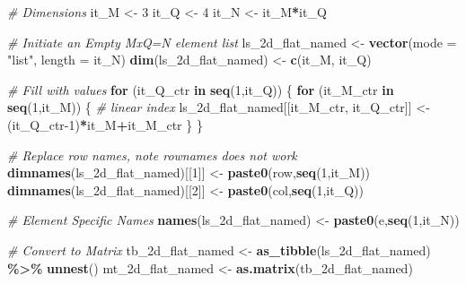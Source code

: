\documentclass[
]{book}
\newenvironment{Shaded}{\begin{snugshade}}{\end{snugshade}}
\newcommand{\CommentTok}[1]{\textcolor[rgb]{0.56,0.35,0.01}{\textit{#1}}}
\newcommand{\ControlFlowTok}[1]{\textcolor[rgb]{0.13,0.29,0.53}{\textbf{#1}}}
\newcommand{\DataTypeTok}[1]{\textcolor[rgb]{0.13,0.29,0.53}{#1}}
\newcommand{\DecValTok}[1]{\textcolor[rgb]{0.00,0.00,0.81}{#1}}
\newcommand{\KeywordTok}[1]{\textcolor[rgb]{0.13,0.29,0.53}{\textbf{#1}}}
\newcommand{\NormalTok}[1]{#1}
\newcommand{\OperatorTok}[1]{\textcolor[rgb]{0.81,0.36,0.00}{\textbf{#1}}}
\newcommand{\StringTok}[1]{\textcolor[rgb]{0.31,0.60,0.02}{#1}}
\begin{document}
\begin{Shaded}
\begin{Highlighting}[]
\CommentTok{\# Dimensions}
\NormalTok{it\_M \textless{}{-}}\StringTok{ }\DecValTok{3}
\NormalTok{it\_Q \textless{}{-}}\StringTok{ }\DecValTok{4}
\NormalTok{it\_N \textless{}{-}}\StringTok{ }\NormalTok{it\_M}\OperatorTok{*}\NormalTok{it\_Q}

\CommentTok{\# Initiate an Empty MxQ=N element list}
\NormalTok{ls\_2d\_flat\_named \textless{}{-}}\StringTok{ }\KeywordTok{vector}\NormalTok{(}\DataTypeTok{mode =} \StringTok{"list"}\NormalTok{, }\DataTypeTok{length =}\NormalTok{ it\_N)}
\KeywordTok{dim}\NormalTok{(ls\_2d\_flat\_named) \textless{}{-}}\StringTok{ }\KeywordTok{c}\NormalTok{(it\_M, it\_Q)}

\CommentTok{\# Fill with values}
\ControlFlowTok{for}\NormalTok{ (it\_Q\_ctr }\ControlFlowTok{in} \KeywordTok{seq}\NormalTok{(}\DecValTok{1}\NormalTok{,it\_Q)) \{}
  \ControlFlowTok{for}\NormalTok{ (it\_M\_ctr }\ControlFlowTok{in} \KeywordTok{seq}\NormalTok{(}\DecValTok{1}\NormalTok{,it\_M)) \{}
    \CommentTok{\# linear index}
\NormalTok{    ls\_2d\_flat\_named[[it\_M\_ctr, it\_Q\_ctr]] \textless{}{-}}\StringTok{ }\NormalTok{(it\_Q\_ctr}\DecValTok{{-}1}\NormalTok{)}\OperatorTok{*}\NormalTok{it\_M}\OperatorTok{+}\NormalTok{it\_M\_ctr}
\NormalTok{  \}}
\NormalTok{\}}

\CommentTok{\# Replace row names, note rownames does not work}
\KeywordTok{dimnames}\NormalTok{(ls\_2d\_flat\_named)[[}\DecValTok{1}\NormalTok{]] \textless{}{-}}\StringTok{ }\KeywordTok{paste0}\NormalTok{(}\StringTok{\textquotesingle{}row\textquotesingle{}}\NormalTok{,}\KeywordTok{seq}\NormalTok{(}\DecValTok{1}\NormalTok{,it\_M))}
\KeywordTok{dimnames}\NormalTok{(ls\_2d\_flat\_named)[[}\DecValTok{2}\NormalTok{]] \textless{}{-}}\StringTok{ }\KeywordTok{paste0}\NormalTok{(}\StringTok{\textquotesingle{}col\textquotesingle{}}\NormalTok{,}\KeywordTok{seq}\NormalTok{(}\DecValTok{1}\NormalTok{,it\_Q))}

\CommentTok{\# Element Specific Names}
\KeywordTok{names}\NormalTok{(ls\_2d\_flat\_named) \textless{}{-}}\StringTok{ }\KeywordTok{paste0}\NormalTok{(}\StringTok{\textquotesingle{}e\textquotesingle{}}\NormalTok{,}\KeywordTok{seq}\NormalTok{(}\DecValTok{1}\NormalTok{,it\_N))}

\CommentTok{\# Convert to Matrix}
\NormalTok{tb\_2d\_flat\_named \textless{}{-}}\StringTok{ }\KeywordTok{as\_tibble}\NormalTok{(ls\_2d\_flat\_named) }\OperatorTok{\%\textgreater{}\%}\StringTok{ }\KeywordTok{unnest}\NormalTok{()}
\NormalTok{mt\_2d\_flat\_named \textless{}{-}}\StringTok{ }\KeywordTok{as.matrix}\NormalTok{(tb\_2d\_flat\_named)}
\end{Highlighting}
\end{Shaded}
\end{document}
